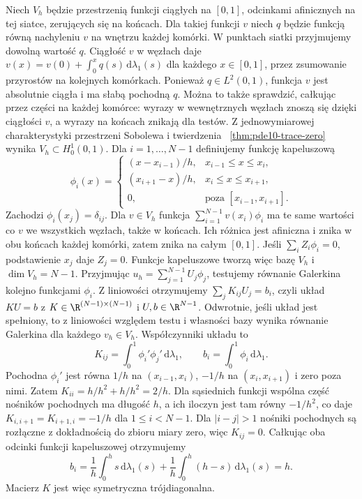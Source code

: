 Niech $V_h$ będzie przestrzenią funkcji ciągłych
na $[0,1]$, odcinkami afinicznych na tej siatce,
zerujących się na końcach.
Dla takiej funkcji $v$ niech $q$ będzie funkcją
równą nachyleniu $v$ na wnętrzu każdej komórki.
W punktach siatki przyjmujemy dowolną wartość $q$.
Ciągłość $v$ w węzłach daje
$v(x)=v(0)+\int_0^x q(s)\,\mathrm d\lambda_1(s)$
dla każdego $x\in[0,1]$, przez zsumowanie przyrostów
na kolejnych komórkach. Ponieważ $q\in L^2(0,1)$,
funkcja $v$ jest absolutnie ciągła i ma słabą
pochodną $q$. Można to także sprawdzić, całkując
przez części na każdej komórce: wyrazy w wewnętrznych
węzłach znoszą się dzięki ciągłości $v$,
a wyrazy na końcach znikają dla testów. Z jednowymiarowej charakterystyki
przestrzeni Sobolewa i twierdzenia
~\ref{thm:pde10-trace-zero} wynika $V_h\subset H_0^1(0,1)$.
Dla $i=1,\ldots,N-1$ definiujemy funkcję kapeluszową
\[
 \phi_i(x)=
 \begin{cases}
 (x-x_{i-1})/h,&x_{i-1}\le x\le x_i,\\
 (x_{i+1}-x)/h,&x_i\le x\le x_{i+1},\\
 0,&\text{poza }[x_{i-1},x_{i+1}].
 \end{cases}
\]
Zachodzi $\phi_i(x_j)=\delta_{ij}$.
Dla $v\in V_h$ funkcja
$\sum_{i=1}^{N-1}v(x_i)\phi_i$ ma te same wartości
co $v$ we wszystkich węzłach, także w końcach.
Ich różnica jest afiniczna i znika w obu końcach
każdej komórki, zatem znika na całym $[0,1]$.
Jeśli $\sum_i Z_i\phi_i=0$, podstawienie $x_j$
daje $Z_j=0$. Funkcje kapeluszowe tworzą więc
bazę $V_h$ i $\dim V_h=N-1$.
Przyjmując $u_h=\sum_{j=1}^{N-1}U_j\phi_j$,
testujemy równanie Galerkina kolejno funkcjami $\phi_i$.
Z liniowości otrzymujemy $\sum_j K_{ij}U_j=b_i$,
czyli układ $KU=b$ z $K\in\R^{(N-1)\times(N-1)}$
i $U,b\in\R^{N-1}$. Odwrotnie, jeśli układ jest
spełniony, to z liniowości względem testu i własności
bazy wynika równanie Galerkina dla każdego $v_h\in V_h$.
Współczynniki układu to
\[
K_{ij}=\int_0^1\phi_i'\phi_j'\,\mathrm d\lambda_1,
\qquad b_i=\int_0^1\phi_i\,\mathrm d\lambda_1.
\]
Pochodna $\phi_i'$ jest równa $1/h$ na $(x_{i-1},x_i)$,
$-1/h$ na $(x_i,x_{i+1})$ i zero poza nimi.
Zatem $K_{ii}=h/h^2+h/h^2=2/h$.
Dla sąsiednich funkcji wspólna część nośników
pochodnych ma długość $h$, a ich iloczyn jest tam
równy $-1/h^2$, co daje $K_{i,i+1}=K_{i+1,i}=-1/h$
dla $1\le i<N-1$.
Dla $|i-j|>1$ nośniki pochodnych są rozłączne
z dokładnością do zbioru miary zero, więc $K_{ij}=0$.
Całkując oba odcinki funkcji kapeluszowej otrzymujemy
\[
 b_i=\frac1h\int_0^h s\,\mathrm d\lambda_1(s)
     +\frac1h\int_0^h(h-s)\,\mathrm d\lambda_1(s)=h.
\]
Macierz $K$ jest więc symetryczna trójdiagonalna.

